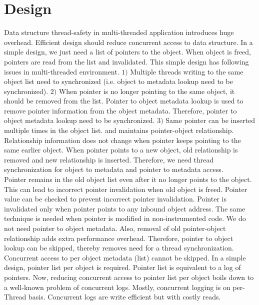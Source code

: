 \section{\projectname{} Design} \label{\projectname{}}
Data structure thread-safety in multi-threaded application introduces huge overhead. Efficient design should reduce concurrent access to data structure. In a simple design, we just need a list of pointers to the object. When object is freed, pointers are read from the list and invalidated. This simple design has following issues in multi-threaded environment. $1)$ Multiple threads writing to the same object list need to synchronized (i.e. object to metadata lookup need to be synchronized). $2)$ When pointer is no longer pointing to the same 
object, it should be removed from the list. Pointer to object metadata lookup is used to remove pointer information from the object metadata. Therefore, pointer to object metadata lookup need to be synchronized. $3)$ Same pointer can be inserted multiple times in the object list. \dangnull{} and \freesentry{} maintains pointer-object relationship. Relationship information does not change when pointer keeps pointing to the same earlier object. When pointer points to a new object, old relationship is removed and new relationship is inserted. Therefore, we need thread synchronization for object to metadata and pointer to metadata access. \\%

Pointer remains in the old object list even after it no longer points to the object. This can lead to incorrect pointer invalidation when old object is freed. Pointer value can be checked to prevent incorrect pointer invalidation. Pointer is invalidated only when pointer points to any inbound object address. The same technique is needed when pointer is modified in non-instrumented code. We do not need pointer to object metadata. Also, removal of old pointer-object relationship adds extra performance overhead. Therefore, pointer to object lookup can be skipped, thereby removes need for a thread synchronization. Concurrent access to per object metadata (list) cannot be skipped. In a simple design, pointer list per object is required. Pointer list is equivalent to a log of pointers. Now, reducing concurrent access to pointer list per object boils down to a well-known problem of concurrent logs. Mostly, concurrent logging is on per-Thread basis. Concurrent logs are write efficient but with costly reads. \\

